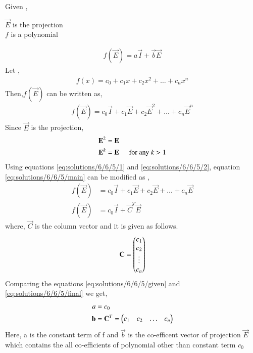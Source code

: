 Given , 
\begin{center}
    $\vec{E}$ is the projection\\
    $f$ is a polynomial
\end{center}
\begin{align}
    f(\vec{E})=a\vec{I}+\vec{b}\vec{E}\label{eq:solutions/6/6/5/given}
\end{align}
Let ,
\begin{align}
    f(x)=c_0+c_1x+c_2x^2+\dots+c_nx^n
\end{align}
Then,$f(\vec{E})$ can be written as,
\begin{align}
    f(\vec{E})=c_0\vec{I}+c_1\vec{E}+c_2\vec{E}^2+\dots+c_n\vec{E}^n \label{eq:solutions/6/6/5/main}
\end{align}
Since $\vec{E}$ is the projection, 
\begin{align}
    \vec{E}^2&=\vec{E} \label{eq:solutions/6/6/5/1}\\
    \vec{E}^k&=\vec{E} \hspace{0.5cm}\text{for any } k>1 \label{eq:solutions/6/6/5/2}
\end{align}
Using equations \eqref{eq:solutions/6/6/5/1} and \eqref{eq:solutions/6/6/5/2}, equation \eqref{eq:solutions/6/6/5/main} can be modified as , 
\begin{align}
        f(\vec{E})&=c_0\vec{I}+c_1\vec{E}+c_2\vec{E}+\dots+c_n\vec{E}\\
        f(\vec{E})&=c_0\vec{I}+\vec{C}^T\vec{E}\label{eq:solutions/6/6/5/final}
\end{align}
where, $\vec{C}$ is the column vector and it is given as follows.
\begin{align}
    \vec{C}=\myvec{c_1\\c_2\\\vdots\\c_n}
\end{align}
Comparing the equations \eqref{eq:solutions/6/6/5/given} and \eqref{eq:solutions/6/6/5/final} we get,
\begin{align}
    a&=c_0\\
    \vec{b}&=\vec{C}^T=\myvec{c_1 & c_2 & \dots&c_n}
\end{align}
Here, a is the constant term of f and $\vec{b}$ is the co-efficent vector of projection $\vec{E}$ which contains the all co-efficients of polynomial other than constant term $c_0$
